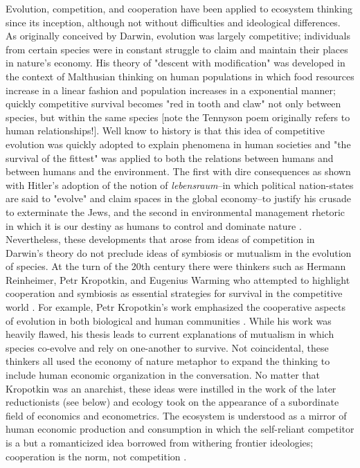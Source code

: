 Evolution, competition, and cooperation have been applied to ecosystem thinking since its inception, although not without difficulties and ideological differences. As originally conceived by Darwin, evolution was largely competitive; individuals from certain species were in constant struggle to claim and maintain their places in nature's economy. His theory of "descent with modification" was developed in the context of Malthusian thinking on human populations in which food resources increase in a linear fashion and population increases in a exponential manner; quickly competitive survival becomes "red in tooth and claw" not only between species, but within the same species \citep{stoddart_1966,tennyson_1849} [note the Tennyson poem originally refers to human relationships!]. Well know to history is that this idea of competitive evolution was quickly adopted to explain phenomena in human societies and "the survival of the fittest" was applied to both the relations between humans and between humans and the environment. The first with dire consequences as shown with Hitler's adoption of the notion of \textit{lebensraum}--in which political nation-states are said to "evolve" and claim spaces in the global economy--to justify his crusade to exterminate the Jews, and the second in environmental management rhetoric in which it is our destiny as humans to control and dominate nature \citep{stoddart_1966,worster_1977}. Nevertheless, these developments that arose from ideas of competition in Darwin's theory do not preclude ideas of symbiosis or mutualism in the evolution of species. At the turn of the 20th century there were thinkers such as Hermann Reinheimer, Petr Kropotkin, and Eugenius Warming who attempted to highlight cooperation and symbiosis as essential strategies for survival in the competitive world \citep{worster_1977}. For example, Petr Kropotkin's work emphasized the cooperative aspects of evolution in both biological and human communities \citep{kropotkin_1902}. While his work was heavily flawed, his thesis leads to current explanations of mutualism in which species co-evolve and rely on one-another to survive. Not coincidental, these thinkers all used the economy of nature metaphor to expand the thinking to include human economic organization in the conversation. No matter that Kropotkin was an anarchist, these ideas were instilled in the work of the later reductionists (see below) and ecology took on the appearance of a subordinate field of economics and econometrics. The ecosystem is understood as a mirror of human economic production and consumption in which the self-reliant competitor is a but a romanticized idea borrowed from withering frontier ideologies; cooperation is the norm, not competition \citep{worster_1977}.

